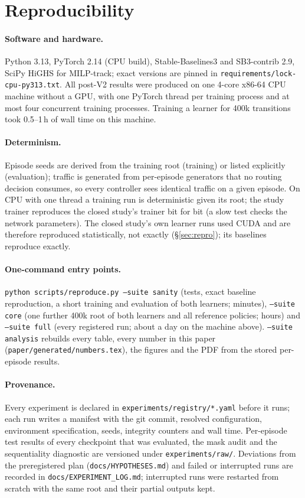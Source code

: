 \section{Reproducibility}
\label{app:repro}

\paragraph{Software and hardware.} Python 3.13, PyTorch 2.14 (CPU build),
Stable-Baselines3 and SB3-contrib 2.9, SciPy HiGHS for MILP-track; exact
versions are pinned in \texttt{requirements/lock-cpu-py313.txt}. All post-V2
results were produced on one 4-core x86-64 CPU machine without a GPU, with one
PyTorch thread per training process and at most four concurrent training
processes. Training a learner for 400k transitions took 0.5--1\,h of wall
time on this machine.

\paragraph{Determinism.} Episode seeds are derived from the training root
(training) or listed explicitly (evaluation); traffic is generated from
per-episode generators that no routing decision consumes, so every controller
sees identical traffic on a given episode. On CPU with one thread a training
run is deterministic given its root; the study trainer reproduces the closed
study's trainer bit for bit (a slow test checks the network parameters). The
closed study's own learner runs used CUDA and are therefore reproduced
statistically, not exactly (\S\ref{sec:repro}); its baselines reproduce
exactly.

\paragraph{One-command entry points.}
\texttt{python scripts/reproduce.py --suite sanity} (tests, exact baseline
reproduction, a short training and evaluation of both learners; minutes),
\texttt{--suite core} (one further 400k root of both learners and all
reference policies; hours) and \texttt{--suite full} (every registered run;
about a day on the machine above). \texttt{--suite analysis} rebuilds every
table, every number in this paper (\texttt{paper/generated/numbers.tex}), the
figures and the PDF from the stored per-episode results.

\paragraph{Provenance.} Every experiment is declared in
\texttt{experiments/registry/*.yaml} before it runs; each run writes a
manifest with the git commit, resolved configuration, environment
specification, seeds, integrity counters and wall time. Per-episode test
results of every checkpoint that was evaluated, the mask audit and the
sequentiality diagnostic are versioned under \texttt{experiments/raw/}.
Deviations from the preregistered plan (\texttt{docs/HYPOTHESES.md}) and
failed or interrupted runs are recorded in \texttt{docs/EXPERIMENT\_LOG.md};
interrupted runs were restarted from scratch with the same root and their
partial outputs kept.
